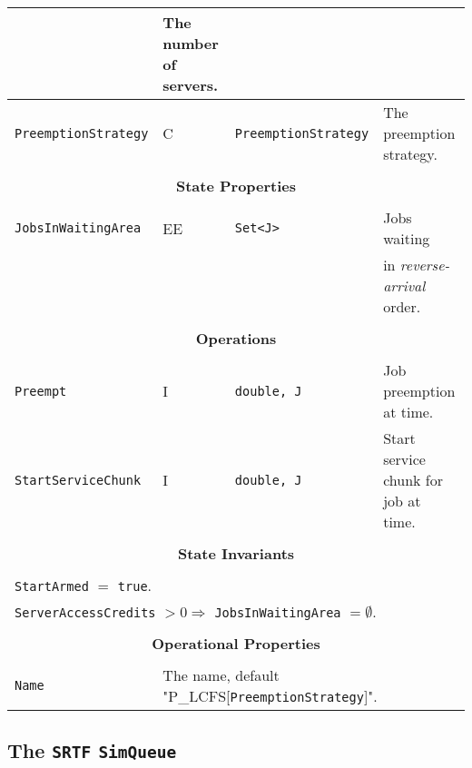 \documentclass[12pt]{book}
\begin{document}
\begin{tabular}{|l|l|l|l|}
                               & The number of servers. \\
\hline
\lstinline|PreemptionStrategy| & C & \lstinline|PreemptionStrategy| & The preemption strategy. \\
\hline
\multicolumn{4}{|c|}{} \\
\multicolumn{4}{|c|}{\bf State  Properties} \\
\multicolumn{4}{|c|}{} \\
\hline
\lstinline|JobsInWaitingArea| & EE & \lstinline|Set<J>| & Jobs waiting \\
                              &    &                    & in {\em reverse-arrival\/} order. \\
\hline
\multicolumn{4}{|c|}{} \\
\multicolumn{4}{|c|}{\bf Operations} \\
\multicolumn{4}{|c|}{} \\
\hline
\lstinline|Preempt| & I & \lstinline|double, J| & Job preemption at time.\\
\hline
\lstinline|StartServiceChunk| & I & \lstinline|double, J| & Start service chunk for job at time.\\
\hline
\multicolumn{4}{|c|}{} \\
\multicolumn{4}{|c|}{\bf State  Invariants} \\
\multicolumn{4}{|c|}{} \\
\hline
\multicolumn{4}{|l|}{\lstinline|StartArmed| $=$ \lstinline|true|.} \\
\multicolumn{4}{|l|}{\lstinline|ServerAccessCredits| $> 0 \Rightarrow$ \lstinline|JobsInWaitingArea| $= \emptyset$.} \\
\hline
\multicolumn{4}{|c|}{} \\
\multicolumn{4}{|c|}{\bf Operational Properties} \\
\multicolumn{4}{|c|}{} \\
\hline
\lstinline|Name| & \multicolumn{3}{|l|}{The name, default "P\_LCFS[\lstinline|PreemptionStrategy|]".} \\
\hline
\end{tabular}

\subsection{The \lstinline{SRTF} \lstinline{SimQueue}}
\end{document}
